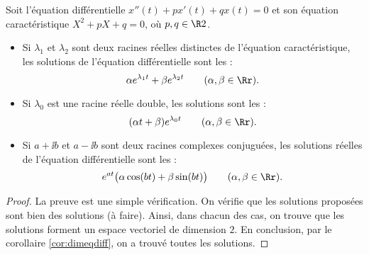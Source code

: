 \documentclass[12pt, class=report,crop=false]{standalone}
\begin{document}
\bigskip

 
\begin{theoreme}
Soit l'équation différentielle $x''(t)+px'(t)+qx(t)=0$
et son équation caractéristique $X^2+pX+q=0$, où $p,q \in \R2$. 
\begin{itemize}
  \item Si $\lambda_1$ et $\lambda_2$ sont deux racines réelles distinctes de l'équation caractéristique, les solutions de l'équation différentielle sont les :
$$\alpha e^{\lambda_1t} + \beta e^{\lambda_2t} \qquad (\alpha,\beta \in \Rr).$$
  
  \item Si $\lambda_0$ est une racine réelle double, les solutions sont les :
$$(\alpha t + \beta) e^{\lambda_0 t}\qquad (\alpha,\beta \in \Rr).$$

  \item Si $a+\ii b$ et $a-\ii b$ sont deux racines complexes conjuguées, les solutions réelles de l'équation différentielle sont les :
$$e^{at} \big( \alpha \cos (bt) + \beta \sin (bt) \big)\qquad (\alpha,\beta \in \Rr).$$
\end{itemize}
\end{theoreme} 
 
 
  
\begin{proof}
La preuve est une simple vérification. On vérifie que les solutions proposées sont bien des solutions (à faire).
Ainsi, dans chacun des cas, on trouve que les solutions forment un espace vectoriel de dimension $2$.
En conclusion, par le corollaire \ref{cor:dimeqdiff}, on a trouvé toutes les solutions.
\end{proof}

 
\end{document}
